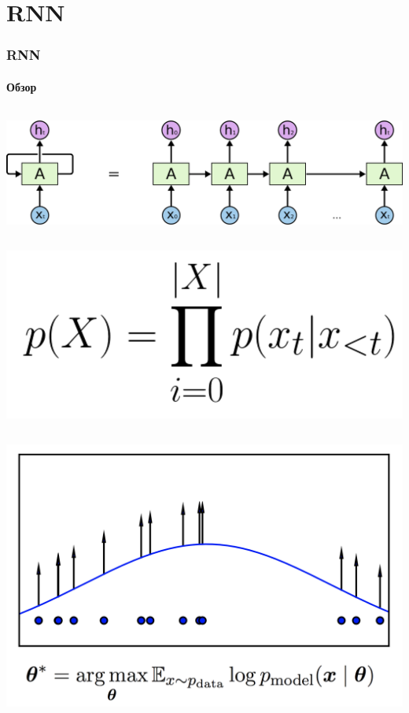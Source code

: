 \documentclass[10pt]{beamer}
\begin{document}
\section{RNN}
\begin{frame}
\frametitle{RNN}
\framesubtitle{Обзор}

\begin{center}
    \begin{column}{0.7\textwidth}
        \includegraphics[height=0.25\textheight]{images/rnn_unrolled.png}
    \end{column}
    \begin{column}{0.25\textwidth}
        \includegraphics[height=0.14\textheight]{images/rnn_p.png}
    \end{column}
    \vskip2mm
    \includegraphics[height=0.5\textheight]{images/mll_density.png}
\end{center}

\end{frame}
\end{document}
